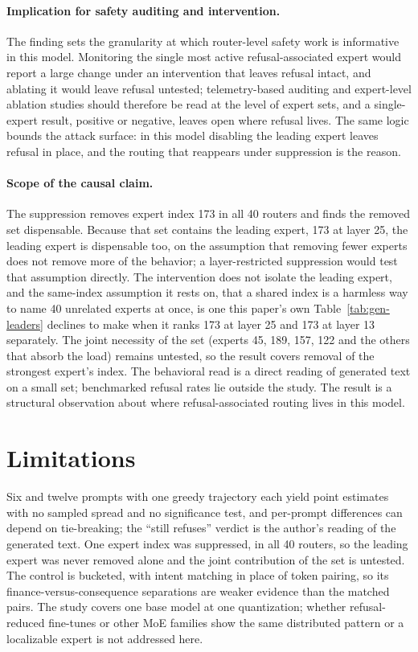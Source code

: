 \documentclass[10pt,twocolumn]{article}
\begin{document}
\paragraph{Implication for safety auditing and intervention.}
The finding sets the granularity at which router-level safety work is
informative in this model. Monitoring the single most active
refusal-associated expert would report a large change under an intervention
that leaves refusal intact, and ablating it would leave refusal untested;
telemetry-based auditing \citep{lv2026routescan} and expert-level ablation
studies should therefore be read at the level of expert sets, and a
single-expert result, positive or negative, leaves open where refusal lives. The same logic bounds the attack surface: in this model
disabling the leading expert leaves refusal in place, and the routing that
reappears under suppression is the reason.

\paragraph{Scope of the causal claim.}
The suppression removes expert index 173 in all 40 routers and finds the
removed set dispensable. Because that set contains the leading expert, 173 at
layer 25, the leading expert is dispensable too, on the assumption that
removing fewer experts does not remove more of the behavior; a
layer-restricted suppression would test that assumption directly. The
intervention does not isolate the leading expert, and the same-index
assumption it rests on, that a shared index is a harmless way to name 40
unrelated experts at once, is one this paper's own Table~\ref{tab:gen-leaders}
declines to make when it ranks 173 at layer 25 and 173 at layer 13
separately. The joint necessity of the set (experts 45, 189, 157, 122 and
the others that absorb the load) remains untested, so the result covers
removal of the strongest expert's index. The behavioral read is a direct
reading of generated text on a small set; benchmarked refusal rates lie
outside the study. The result is a structural observation about where refusal-associated
routing lives in this model.

\section{Limitations}
\label{sec:limits}

Six and twelve prompts with one greedy trajectory each yield point estimates
with no sampled spread and no significance test, and per-prompt differences
can depend on tie-breaking; the ``still refuses'' verdict is the author's
reading of the generated text. One expert index was suppressed, in all 40 routers, so the leading expert
was never removed alone and the joint contribution of the set is untested. The control is bucketed, with intent matching in place of token pairing, so
its finance-versus-consequence separations are weaker evidence than the
matched pairs. The study covers one base model at one
quantization; whether refusal-reduced fine-tunes or other MoE families show
the same distributed pattern or a localizable expert \citep{lai2025safex} is
not addressed here.
\end{document}

